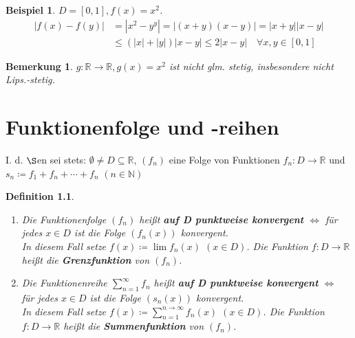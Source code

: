 \documentclass[12pt]{extreport} %
\newcommand{\N}{\mathbb{N}}
\newcommand{\R}{\mathbb{R}}
\theoremstyle{named}
\theoremstyle{dotless}
\newtheorem*{beispiel*}{Beispiel}
\newtheorem*{bemerkung}{Bemerkung}
\newtheorem*{definition}{Definition}
\begin{document}
\begin{beispiel*}
	$D = [0, 1], f(x) = x^{2}$.
	\begin{align*}
		|f(x) - f(y) | & = |x^{2} - y^{y}| = |(x + y) (x - y)| = |x+y| |x-y| \\
			& \leq (|x| + |y|) |x - y| \leq 2 |x - y| \quad \forall x, y \in [0, 1]
	\end{align*}
\end{beispiel*}


\begin{bemerkung}
	$g \colon \R \rightarrow \R, g(x) = x^{2}$ ist nicht glm. stetig, insbesondere nicht Lips.-stetig.	
\end{bemerkung}

\newpage

\chapter{Funktionenfolge und -reihen}
I. d. $\S$en sei stets: $\emptyset \neq D \subseteq \R$, $(f_{n})$ eine Folge von Funktionen $f_{n} \colon D \rightarrow \R$ und $s_{n} \coloneqq f_{1} + f_{n} + \cdots + f_{n}$ $(n \in \N)$

  
\begin{definition} ~\
 	\begin{enumerate}
		\item Die Funktionenfolge $(f_{n})$ hei{\ss}t \textbf{auf D punktweise konvergent} $\iff$ für jedes $x \in D$ ist die Folge $(f_{n}(x))$ konvergent. \\
			In diesem Fall setze $f(x) \coloneqq \lim f_{n}(x)$ $(x \in D)$. Die Funktion $f \colon D \rightarrow \R$ hei{\ss}t die \textbf{Grenzfunktion} von $(f_{n})$.
		\item Die Funktionenreihe $\sum_{n=1}^{\infty} f_{n}$ hei{\ss}t  \textbf{auf D punktweise konvergent} $\iff$ für jedes $x \in D$ ist die Folge $(s_{n}(x))$ konvergent. \\
			In diesem Fall setze $f(x) \coloneqq \sum_{n=1}^{n\rightarrow\infty} f_{n}(x)$ $(x \in D)$. Die Funktion $f \colon D \rightarrow \R$ hei{\ss}t die \textbf{Summenfunktion} von $(f_{n})$.
	\end{enumerate}
\end{definition}
\end{document}
